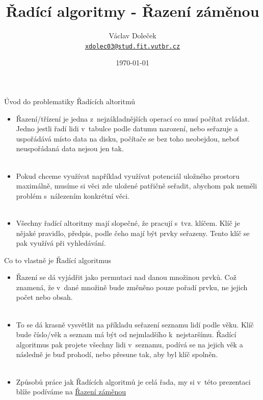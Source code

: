 \documentclass[11pt]{beamer}
\title{Řadící algoritmy - Řazení záměnou}
\author[Václav Doleček]{Václav Doleček\\
{\small \href{xdolec03@stud.fit.vutbr.cz}{\texttt{xdolec03@stud.fit.vutbr.cz}}}}
\institute[VUT]{Vysoké učení technické \\ Fakulta informačných technológií}
\date{\today}
\begin{document}
 
\frame{\titlepage}

 
\begin{frame}[fragile]{Úvod do problematiky Řadících altoritmů}
\begin{itemize}
    \item Řazení/třízení je jedna z~nejzákladnějších operací co musí počítat zvládat. Jedno jestli řadí lidi v~tabulce podle datumu narození, nebo seřazuje a uspořádává místo data na disku, počítače se bez toho neobejdou, neboť neuspořádaná data nejsou jen tak.\\
    \
    
    \item Pokud chceme využívat například využívat potenciál uložného prostoru maximálně, musíme si věci zde uložené patřičně seřadit, abychom pak neměli problém s~nálezením konkrétní věci.\\
    \
    
    \item Všechny řadící altoritmy mají slopečné, že pracují s~tvz. klíčem. Klíč je nějaké pravidlo, předpis, podle čeho mají být prvky seřazeny. Tento klíč se pak využívá při vyhledávání.
\end{itemize}
\end{frame}




\begin{frame}[fragile]{Co to vlastně je Řadící algoritmus}
\begin{itemize}

    \item Řazení se dá vyjádřit jako permutaci nad danou množinou prvků. Což znamená, že v~dané množině bude změněno pouze pořadí prvku, ne jejich počet nebo obsah.\\
    \
    
    \item To se dá krasně vysvětlit na příkladu seřazení seznamu lidí podle věku. Klíč bude číslo/věk a seznam má být od nejmladšího k~nejstaršímu. Řadící algoritmus pak projete všechny lidi v~seznamu, podívá se na jejich věk a následně je buď prohodí, nebo přesune tak, aby byl klíč spolněn.\\
    \
    
    \item Způsobů práce jak Řadících algoritmů je celá řada, my si v~této prezentaci blíže podíváme na \underline{Řazení záměnou}
    
\end{itemize}
\end{frame}
 
\end{document}
